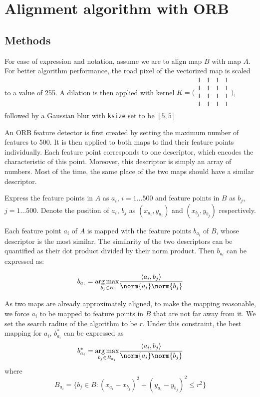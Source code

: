 

\section{Alignment algorithm with ORB}

\subsection{Methods}

For ease of expression and notation, assume we are to align map $B$ with map $A$. For better algorithm performance, the road pixel of the vectorized map is scaled to a value of 255. A dilation is then applied with kernel 
$K = \bigg(\begin{smallmatrix}
  1 & 1 & 1 & 1\\
  1 & 1 & 1 & 1\\
  1 & 1 & 1 & 1\\
  1 & 1 & 1 & 1\\
\end{smallmatrix}\bigg)$,
followed by a Gaussian blur with \texttt{\small ksize} set to be $[5, 5]$

An ORB feature detector is first created by setting the maximum number of features to 500. It is then applied to both maps to find their feature points individually. Each feature point corresponds to one descriptor, which encodes the characteristic of this point. Moreover, this descriptor is simply an array of numbers. Most of the time, the same place of the two maps should have a similar descriptor.

Express the feature points in $A$ as $a_i$, $i = 1 \dots 500$ and feature points in $B$ as $b_j$, $j = 1 \dots 500$. Denote the position of $a_i$, $b_j$ as $(x_{a_i}, y_{a_i})$ and $(x_{b_j}, y_{b_j})$ respectively.

Each feature point $a_i$ of $A$ is mapped with the feature points $b_{a_i}$ of $B$, whose descriptor is the most similar. The similarity of the two descriptors can be quantified as their dot product divided by their norm product. Then $b_{a_i}$ can be expressed as:

\begin{equation}
   b_{a_i} = \underset{b_j \in B}{\arg\max} \frac{\langle a_i, b_j \rangle}{\norm{a_i} \norm{b_j}}
\end{equation}

As two maps are already approximately aligned, to make the mapping reasonable, we force $a_i$ to be mapped to feature points in $B$ that are not far away from it. We set the search radius of the algorithm to be $r$. Under this constraint, the best mapping for $a_i$, $b_{a_i}^*$ can be expressed as
\begin{equation}
   b_{a_i}^* = \underset{b_j \in B_{a_i}}{\arg\max} \frac{\langle a_i, b_j \rangle}{\norm{a_i} \norm{b_j}}
\end{equation}
where
\begin{equation}
    B_{a_i} = \{b_j \in B: (x_{a_i}-x_{b_j})^2 + (y_{a_i}-y_{b_j})^2 \leq r^2\}
\end{equation}

